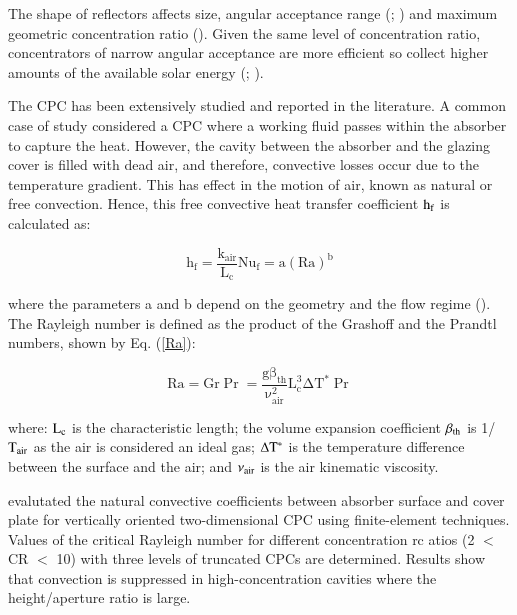 

The shape of reflectors affects size, angular acceptance range (\cite{Zacharopoulos2000}; \cite{Harmim2012}) and maximum geometric concentration ratio (\cite{Mills1978}). Given the same level of concentration ratio, concentrators of narrow angular acceptance are more efficient so collect higher amounts of the available solar energy (\cite{Sarmah2011}; \cite{Kostic2012}).

The CPC has been extensively studied and reported in the literature. A common case of study considered a CPC where a working fluid passes within the absorber to capture the heat. However, the cavity between the absorber and the glazing cover is filled with dead air, and therefore, convective losses occur due to the temperature gradient. This has effect in the motion of air, known as natural or free convection. Hence, this free convective heat transfer coefficient $\rm{h_f}$ is calculated as:

\begin{equation}
	\mathrm{h_f = \frac{{{k_{air}}}}{{{L_c}}}Nu_{f} = a{(Ra)^b}}
	\label{hn}
\end{equation}

\noindent where the parameters a and b depend on the geometry and the flow regime (\cite{Cengel2005}). The Rayleigh number is defined as the product of the Grashoff and the Prandtl numbers, shown by Eq. (\ref{Ra}):

\begin{equation}
	\mathrm{Ra = Gr \Pr = {\frac{{g{\beta_{th}}}}{{\nu_{air}^2}}{L^{3}_c}\Delta T^{*}\Pr}}
	\label{Ra}
\end{equation}

\noindent where: $\rm{L_{c}}$ is the characteristic length; the volume expansion coefficient $\beta_{\rm{th}}$ is 1/$\rm{T_{air}}$ as the air is considered an ideal gas; $\rm{\Delta T^{*}}$ is the temperature difference between the surface and the air; and $\nu_{\rm{air}}$ is the air kinematic viscosity.

\citet{AbdelKhalik1978} evalutated the natural convective coefficients between absorber surface and cover plate for vertically oriented two-dimensional CPC using finite-element techniques. Values of the critical Rayleigh number for different concentration rc atios (2 $<$ CR $<$ 10) with three levels of truncated CPCs are determined. Results show that convection is suppressed in high-concentration cavities where the height/aperture ratio is large.

